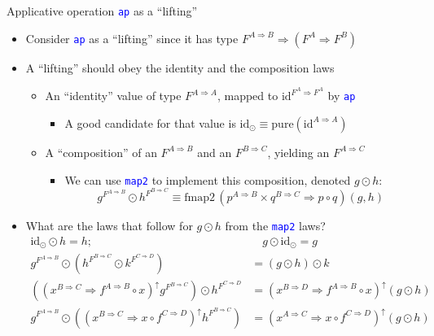 \documentclass[english]{beamer}
\begin{document}
\begin{frame}{Applicative operation \texttt{\textcolor{blue}{\footnotesize{}ap}}
as a ``lifting''}
\begin{itemize}
\item \vspace{-0.18cm}Consider \texttt{\textcolor{blue}{\footnotesize{}ap}}
as a ``lifting'' since it has type{\footnotesize{} $F^{A\Rightarrow B}\Rightarrow\left(F^{A}\Rightarrow F^{B}\right)$}{\footnotesize \par}
\item A ``lifting'' should obey the identity and the composition laws
\begin{itemize}
\item An ``identity'' value of type $F^{A\Rightarrow A}$, mapped to $\text{id}^{F^{A}\Rightarrow F^{A}}$
by \texttt{\textcolor{blue}{\footnotesize{}ap}} 
\begin{itemize}
\item A good candidate for that value is $\text{id}_{\odot}\equiv\text{pure}\left(\text{id}^{A\Rightarrow A}\right)$
\end{itemize}
\item A ``composition'' of an $F^{A\Rightarrow B}$ and an $F^{B\Rightarrow C}$,
yielding an $F^{A\Rightarrow C}$
\begin{itemize}
\item We can use \texttt{\textcolor{blue}{\footnotesize{}map2}} to implement
this composition, denoted $g\odot h$:
\[
g^{F^{A\Rightarrow B}}\odot h^{F^{B\Rightarrow C}}\equiv\text{fmap2}\,(p^{A\Rightarrow B}\times q^{B\Rightarrow C}\Rightarrow p\circ q)\left(g,h\right)
\]
\end{itemize}
\end{itemize}
\item What are the laws that follow for $g\odot h$ from the \texttt{\textcolor{blue}{\footnotesize{}map2}}
laws?{\footnotesize{}
\begin{align*}
\text{id}_{\odot}\odot h=h; & \quad g\odot\text{id}_{\odot}=g\\
g^{F^{A\Rightarrow B}}\odot(h^{F^{B\Rightarrow C}}\odot k^{F^{C\Rightarrow D}}) & =\left(g\odot h\right)\odot k\\
\left((x^{B\Rightarrow C}\Rightarrow f^{A\Rightarrow B}\circ x)^{\uparrow}g^{F^{B\Rightarrow C}}\right)\odot h^{F^{C\Rightarrow D}} & =(x^{B\Rightarrow D}\Rightarrow f^{A\Rightarrow B}\circ x)^{\uparrow}\left(g\odot h\right)\\
g^{F^{A\Rightarrow B}}\odot\left((x^{B\Rightarrow C}\Rightarrow x\circ f^{C\Rightarrow D})^{\uparrow}h^{F^{B\Rightarrow C}}\right) & =(x^{A\Rightarrow C}\Rightarrow x\circ f^{C\Rightarrow D})^{\uparrow}\left(g\odot h\right)

\end{align*}}
\end{itemize}
\end{frame}
\end{document}
